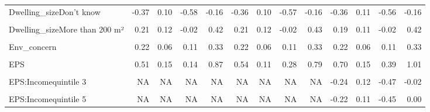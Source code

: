 \begin{table}
\begin{tabular}[t]{lrrrrrrrrrrrr}
Dwelling\_sizeDon't know & -0.37 & 0.10 & -0.58 & -0.16 & -0.36 & 0.10 & -0.57 & -0.16 & -0.36 & 0.11 & -0.56 & -0.16\\
\cellcolor{gray!10}{Dwelling\_sizeLess than 25 m²} & \cellcolor{gray!10}{-0.42} & \cellcolor{gray!10}{0.24} & \cellcolor{gray!10}{-0.90} & \cellcolor{gray!10}{0.05} & \cellcolor{gray!10}{-0.42} & \cellcolor{gray!10}{0.24} & \cellcolor{gray!10}{-0.91} & \cellcolor{gray!10}{0.03} & \cellcolor{gray!10}{-0.42} & \cellcolor{gray!10}{0.24} & \cellcolor{gray!10}{-0.92} & \cellcolor{gray!10}{0.03}\\
Dwelling\_sizeMore than 200 m² & 0.21 & 0.12 & -0.02 & 0.42 & 0.21 & 0.12 & -0.02 & 0.43 & 0.19 & 0.11 & -0.02 & 0.42\\
\cellcolor{gray!10}{Rural} & \cellcolor{gray!10}{0.11} & \cellcolor{gray!10}{0.06} & \cellcolor{gray!10}{-0.01} & \cellcolor{gray!10}{0.23} & \cellcolor{gray!10}{0.11} & \cellcolor{gray!10}{0.06} & \cellcolor{gray!10}{-0.01} & \cellcolor{gray!10}{0.22} & \cellcolor{gray!10}{0.11} & \cellcolor{gray!10}{0.06} & \cellcolor{gray!10}{-0.01} & \cellcolor{gray!10}{0.23}\\
Env\_concern & 0.22 & 0.06 & 0.11 & 0.33 & 0.22 & 0.06 & 0.11 & 0.33 & 0.22 & 0.06 & 0.11 & 0.33\\
\cellcolor{gray!10}{Gov\_support} & \cellcolor{gray!10}{10.33} & \cellcolor{gray!10}{2.57} & \cellcolor{gray!10}{7.03} & \cellcolor{gray!10}{17.94} & \cellcolor{gray!10}{10.24} & \cellcolor{gray!10}{2.43} & \cellcolor{gray!10}{6.97} & \cellcolor{gray!10}{17.19} & \cellcolor{gray!10}{10.27} & \cellcolor{gray!10}{2.49} & \cellcolor{gray!10}{7.10} & \cellcolor{gray!10}{17.53}\\
EPS & 0.51 & 0.15 & 0.14 & 0.87 & 0.54 & 0.11 & 0.28 & 0.79 & 0.70 & 0.15 & 0.39 & 1.01\\
\cellcolor{gray!10}{EPS:Incomequintile 2} & \cellcolor{gray!10}{NA} & \cellcolor{gray!10}{NA} & \cellcolor{gray!10}{NA} & \cellcolor{gray!10}{NA} & \cellcolor{gray!10}{NA} & \cellcolor{gray!10}{NA} & \cellcolor{gray!10}{NA} & \cellcolor{gray!10}{NA} & \cellcolor{gray!10}{-0.03} & \cellcolor{gray!10}{0.12} & \cellcolor{gray!10}{-0.25} & \cellcolor{gray!10}{0.20}\\
EPS:Incomequintile 3 & NA & NA & NA & NA & NA & NA & NA & NA & -0.24 & 0.12 & -0.47 & -0.02\\
\cellcolor{gray!10}{EPS:Incomequintile 4} & \cellcolor{gray!10}{NA} & \cellcolor{gray!10}{NA} & \cellcolor{gray!10}{NA} & \cellcolor{gray!10}{NA} & \cellcolor{gray!10}{NA} & \cellcolor{gray!10}{NA} & \cellcolor{gray!10}{NA} & \cellcolor{gray!10}{NA} & \cellcolor{gray!10}{-0.24} & \cellcolor{gray!10}{0.11} & \cellcolor{gray!10}{-0.47} & \cellcolor{gray!10}{-0.02}\\
EPS:Incomequintile 5 & NA & NA & NA & NA & NA & NA & NA & NA & -0.22 & 0.11 & -0.45 & 0.00\\
\bottomrule
\end{tabular}
\end{table}
